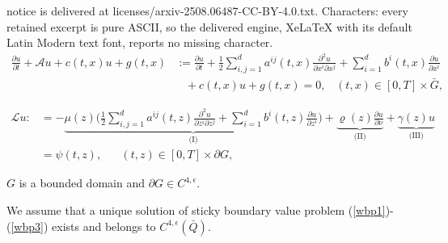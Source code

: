 \documentclass[10pt,a4paper]{amsart}
\begin{document}
notice is delivered at licenses/arxiv-2508.06487-CC-BY-4.0.txt. Characters: every retained excerpt is pure ASCII, so the delivered engine, XeLaTeX with its default Latin Modern text font, reports no missing character.
\begin{align}
 \frac{\partial u}{\partial t}  +  \mathcal{A}u  + c(t,x)u + g(t,x)  &:= \frac{\partial u}{\partial t} + \frac{1}{2}\sum\limits_{i,j=1}^{d}a^{ij}(t,x)\frac{\partial^{2}u}{\partial x^{i}\partial x^{j}}  +  \sum\limits_{i=1}^{d}b^{i}(t,x)\frac{\partial u}{\partial x^{i}} \nonumber\\  & \;\;\; + c(t,x)u + g(t,x) = 0,\;\;\; (t,x) \in [0,T]\times \bar{G},  \label{wbp1}
\end{align}

\begin{align}\label{wbp3}
     \mathscr{L}u : &= -\underbrace{\mu(z)\bigg(\frac{1}{2}\sum\limits_{i,j=1}^{d}a^{ij}(t,z)\frac{\partial^{2}u}{\partial z^{i}\partial z^{j}} + \sum\limits_{i=1}^{d}b^{i}(t,z)\frac{\partial u}{\partial z^{i}} \bigg)}_{\text{(I)}} + \underbrace{\varrho(z)\frac{\partial u}{\partial \nu}}_{\text{(II)}}  + \underbrace{\gamma(z)u}_{\text{(III)}}\nonumber \\ & 
    = \psi(t,z),\;\;\;\;\;\; (t,z) \in [0,T]\times\partial G,
\end{align}

\begin{assumption}\label{boundary_assum} $ G$ is a bounded domain and $\partial G \in C^{4,\epsilon}$. 
\end{assumption}

\begin{assumption}\label{ellip_assum}
    We assume that a unique solution of sticky boundary value problem (\ref{wbp1})-(\ref{wbp3}) exists and belongs to $C^{4, \epsilon}(\bar{Q})$. 
\end{assumption}
\end{document}
